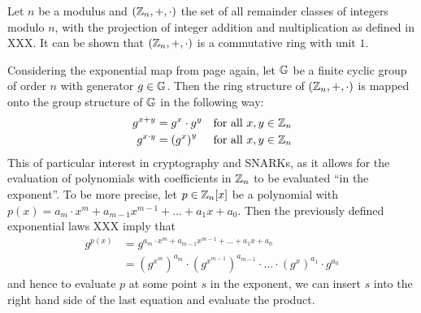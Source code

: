 \begin{example} Let $n$ be a modulus and $(\mathbb{Z}_n,+,\cdot)$ the set of all remainder classes of integers modulo $n$, with the projection of integer addition and multiplication as defined in XXX. It can be shown that $(\mathbb{Z}_n,+,\cdot)$ is a commutative ring with unit $1$.
\end{example}
Considering the exponential map from page \pageref{exponentialmap}  again, let $\mathbb{G}$ be a finite cyclic group of order $n$ with generator $g\in\mathbb{G}$. Then the ring structure of $(\mathbb{Z}_n,+,\cdot)$ is mapped onto the group structure of $\mathbb{G}$ in the following way:
\begin{align*}
g^{x+y} &= g^x\cdot g^y & \text{for all } x,y\in\mathbb{Z}_n\\
g^{x\cdot y} &= \left( g^x\right)^y & \text{for all } x,y\in\mathbb{Z}_n
\end{align*}
This of particular interest in cryptography and SNARKs, as it allows for the evaluation of polynomials with coefficients in $\mathbb{Z}_n$ to be evaluated ``in the exponent''. To be more precise, let $p\in \mathbb{Z}_n[x]$ be a polynomial with $p(x)=a_m\cdot x^m+a_{m-1}x^{m-1}+\ldots + a_1x +a_0$. Then the previously defined exponential laws XXX imply that
\begin{align*}
g^{p(x)} & = g^{a_m\cdot x^m+a_{m-1}x^{m-1}+\ldots + a_1x +a_0}\\
         & = \left(g^{x^m}\right)^{a_m}\cdot \left(g^{x^{m-1}}\right)^{a_{m-1}}\cdot \ldots\cdot \left(g^{x}\right)^{a_1}\cdot g^{a_0}
\end{align*}
and hence to evaluate $p$ at some point $s$ in the exponent, we can insert $s$ into the right hand side of the last equation and evaluate the product.

